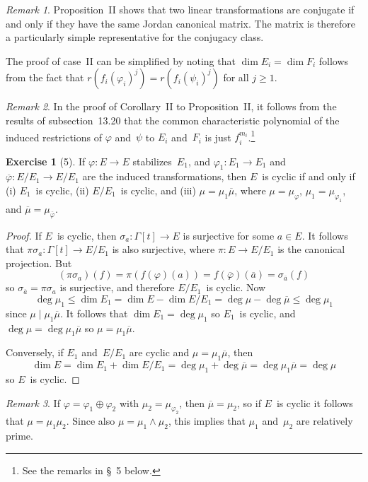 \documentclass[letterpaper,12pt]{article}
\newcommand{\divides}{\mid}
\newcommand{\meet}{\wedge}
\newcommand{\dsum}{\oplus}
\newcommand{\proj}[1]{\overline{#1}}
\theoremstyle{definition}
\newtheorem*{exer}{Exercise}
\theoremstyle{remark}
\newtheorem*{rmk}{Remark}
\begin{document}
\begin{rmk}
Proposition~II shows that two linear transformations are conjugate if and only if they have the same Jordan canonical matrix. The matrix is therefore a particularly simple representative for the conjugacy class.

The proof of case~II can be simplified by noting that \(\dim E_i=\dim F_i\) follows from the fact that \(r(f_i(\varphi_i)^j)=r(f_i(\psi_i)^j)\) for all \(j\ge 1\).
\end{rmk}

\begin{rmk}
In the proof of Corollary~II to Proposition~II, it follows from the results of subsection~13.20 that the common characteristic polynomial of the induced restrictions of \(\varphi\) and~\(\psi\) to \(E_i\) and~\(F_i\) is just \(f_i^{m_i}\).\footnote{See the remarks in \S~5 below.}
\end{rmk}

\begin{exer}[5]
If \(\varphi:E\to E\) stabilizes~\(E_1\), and \(\varphi_1:E_1\to E_1\) and \(\proj{\varphi}:E/E_1\to E/E_1\) are the induced transformations, then \(E\)~is cyclic if and only if (i) \(E_1\)~is cyclic, (ii) \(E/E_1\)~is cyclic, and (iii) \(\mu=\mu_1\proj{\mu}\), where \(\mu=\mu_{\varphi}\), \(\mu_1=\mu_{\varphi_1}\), and \(\proj{\mu}=\mu_{\proj{\varphi}}\).
\end{exer}
\begin{proof}
If \(E\)~is cyclic, then \(\sigma_a:\Gamma[t]\to E\) is surjective for some \(a\in E\). It follows that \(\pi\sigma_a:\Gamma[t]\to E/E_1\) is also surjective, where \(\pi:E\to E/E_1\) is the canonical projection. But
\[(\pi\sigma_a)(f)=\pi(f(\varphi)(a))=f(\proj{\varphi})(\proj{a})=\sigma_{\proj{a}}(f)\]
so \(\sigma_{\proj{a}}=\pi\sigma_a\) is surjective, and therefore \(E/E_1\)~is cyclic. Now
\[\deg\mu_1\le\dim E_1=\dim E-\dim E/E_1=\deg\mu-\deg\proj{\mu}\le\deg\mu_1\]
since \(\mu\divides\mu_1\proj{\mu}\). It follows that \(\dim E_1=\deg\mu_1\) so \(E_1\)~is cyclic, and \(\deg\mu=\deg\mu_1\proj{\mu}\) so \(\mu=\mu_1\proj{\mu}\).

Conversely, if \(E_1\) and~\(E/E_1\) are cyclic and \(\mu=\mu_1\proj{\mu}\), then
\[\dim E=\dim E_1+\dim E/E_1=\deg\mu_1+\deg\proj{\mu}=\deg\mu_1\proj{\mu}=\deg\mu\]
so \(E\)~is cyclic.
\end{proof}

\begin{rmk}
If \(\varphi=\varphi_1\dsum\varphi_2\) with \(\mu_2=\mu_{\varphi_2}\), then \(\proj{\mu}=\mu_2\), so if \(E\)~is cyclic it follows that \(\mu=\mu_1\mu_2\). Since also \(\mu=\mu_1\meet\mu_2\), this implies that \(\mu_1\) and~\(\mu_2\) are relatively prime.
\end{rmk}
\end{document}
